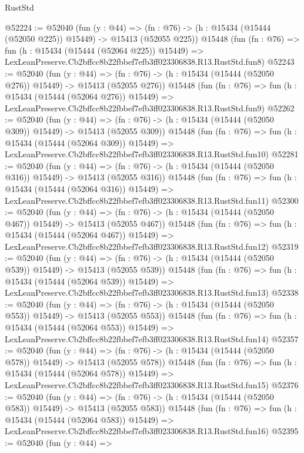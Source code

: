 \begin{lexlean}{RustStd}
\begin{coremodule}
@52224 := @52040
    (fun (y : @44) =>
    (fn : @76) -> (h : @15434 (@15444 (@52050 @225)) @15449) -> @15413 (@52055 @225))
    @15448
    (fun (fn : @76) =>
    fun (h : @15434 (@15444 (@52064 @225)) @15449) =>
    LexLeanPreserve.Cb2bffcc8b22fbbef7efb3ff023306838.R13.RustStd.fun8)
@52243 := @52040
    (fun (y : @44) =>
    (fn : @76) -> (h : @15434 (@15444 (@52050 @276)) @15449) -> @15413 (@52055 @276))
    @15448
    (fun (fn : @76) =>
    fun (h : @15434 (@15444 (@52064 @276)) @15449) =>
    LexLeanPreserve.Cb2bffcc8b22fbbef7efb3ff023306838.R13.RustStd.fun9)
@52262 := @52040
    (fun (y : @44) =>
    (fn : @76) -> (h : @15434 (@15444 (@52050 @309)) @15449) -> @15413 (@52055 @309))
    @15448
    (fun (fn : @76) =>
    fun (h : @15434 (@15444 (@52064 @309)) @15449) =>
    LexLeanPreserve.Cb2bffcc8b22fbbef7efb3ff023306838.R13.RustStd.fun10)
@52281 := @52040
    (fun (y : @44) =>
    (fn : @76) -> (h : @15434 (@15444 (@52050 @316)) @15449) -> @15413 (@52055 @316))
    @15448
    (fun (fn : @76) =>
    fun (h : @15434 (@15444 (@52064 @316)) @15449) =>
    LexLeanPreserve.Cb2bffcc8b22fbbef7efb3ff023306838.R13.RustStd.fun11)
@52300 := @52040
    (fun (y : @44) =>
    (fn : @76) -> (h : @15434 (@15444 (@52050 @467)) @15449) -> @15413 (@52055 @467))
    @15448
    (fun (fn : @76) =>
    fun (h : @15434 (@15444 (@52064 @467)) @15449) =>
    LexLeanPreserve.Cb2bffcc8b22fbbef7efb3ff023306838.R13.RustStd.fun12)
@52319 := @52040
    (fun (y : @44) =>
    (fn : @76) -> (h : @15434 (@15444 (@52050 @539)) @15449) -> @15413 (@52055 @539))
    @15448
    (fun (fn : @76) =>
    fun (h : @15434 (@15444 (@52064 @539)) @15449) =>
    LexLeanPreserve.Cb2bffcc8b22fbbef7efb3ff023306838.R13.RustStd.fun13)
@52338 := @52040
    (fun (y : @44) =>
    (fn : @76) -> (h : @15434 (@15444 (@52050 @553)) @15449) -> @15413 (@52055 @553))
    @15448
    (fun (fn : @76) =>
    fun (h : @15434 (@15444 (@52064 @553)) @15449) =>
    LexLeanPreserve.Cb2bffcc8b22fbbef7efb3ff023306838.R13.RustStd.fun14)
@52357 := @52040
    (fun (y : @44) =>
    (fn : @76) -> (h : @15434 (@15444 (@52050 @578)) @15449) -> @15413 (@52055 @578))
    @15448
    (fun (fn : @76) =>
    fun (h : @15434 (@15444 (@52064 @578)) @15449) =>
    LexLeanPreserve.Cb2bffcc8b22fbbef7efb3ff023306838.R13.RustStd.fun15)
@52376 := @52040
    (fun (y : @44) =>
    (fn : @76) -> (h : @15434 (@15444 (@52050 @583)) @15449) -> @15413 (@52055 @583))
    @15448
    (fun (fn : @76) =>
    fun (h : @15434 (@15444 (@52064 @583)) @15449) =>
    LexLeanPreserve.Cb2bffcc8b22fbbef7efb3ff023306838.R13.RustStd.fun16)
@52395 := @52040
    (fun (y : @44) =>

\end{coremodule}
\end{lexlean}
